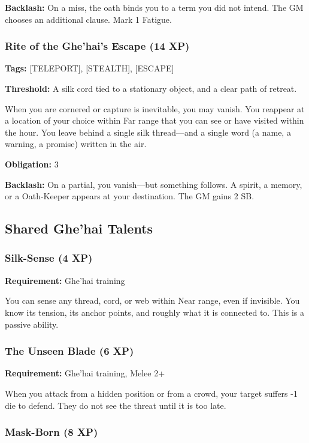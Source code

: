 \textbf{Backlash:} On a miss, the oath binds you to a term you did not intend. The GM chooses an additional clause. Mark 1 Fatigue.

\subsubsection{Rite of the Ghe'hai's Escape (14 XP)}

\textbf{Tags:} [TELEPORT], [STEALTH], [ESCAPE]

\textbf{Threshold:} A silk cord tied to a stationary object, and a clear path of retreat.

When you are cornered or capture is inevitable, you may vanish. You reappear at a location of your choice within Far range that you can see or have visited within the hour. You leave behind a single silk thread—and a single word (a name, a warning, a promise) written in the air.

\textbf{Obligation:} 3

\textbf{Backlash:} On a partial, you vanish—but something follows. A spirit, a memory, or a Oath-Keeper appears at your destination. The GM gains 2 SB.

\subsection{Shared Ghe'hai Talents}

\subsubsection{Silk-Sense (4 XP)}

\textbf{Requirement:} Ghe'hai training

You can sense any thread, cord, or web within Near range, even if invisible. You know its tension, its anchor points, and roughly what it is connected to. This is a passive ability.

\subsubsection{The Unseen Blade (6 XP)}

\textbf{Requirement:} Ghe'hai training, Melee 2+

When you attack from a hidden position or from a crowd, your target suffers -1 die to defend. They do not see the threat until it is too late.

\subsubsection{Mask-Born (8 XP)}

